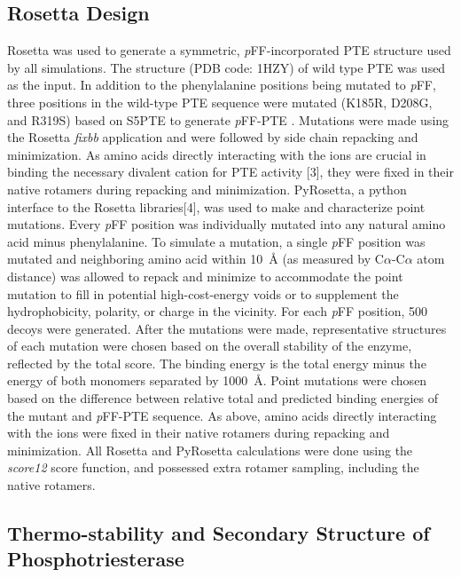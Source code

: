 \begin{refsection}
\subsection{Rosetta Design}
\label{sec:pyrosetta-method}

Rosetta\cite{Leaver-Fay2011,DiMaio2011a} was used to generate a symmetric,
\emph{p}FF-incorporated PTE structure used by all simulations. The structure
(PDB code: 1HZY) of wild type PTE was used as the input. In addition to the
phenylalanine positions being mutated to \emph{p}FF, three positions in the
wild-type PTE sequence were mutated (K185R, D208G, and R319S) based on S5PTE to
generate \emph{p}FF-PTE \cite{Roodveldt2005}. Mutations were made using the
Rosetta \emph{fixbb} application and were followed by side chain repacking and
minimization. As amino acids directly interacting with the  ions
are crucial in binding the necessary divalent cation for PTE activity [3], 
they were fixed in their native rotamers during repacking and minimization.
PyRosetta, a python interface to the Rosetta libraries[4], was used to make and
characterize point mutations. Every \emph{p}FF position was individually
mutated into any natural amino acid minus phenylalanine. To simulate a
mutation, a single \emph{p}FF position was mutated and neighboring amino acid
within \SI{10}{\angstrom} (as measured by C$\alpha$-C$\alpha$ atom distance) was
allowed to repack and minimize to accommodate the point mutation to fill in
potential high-cost-energy voids or to supplement the hydrophobicity, polarity,
or charge in the vicinity. For each \emph{p}FF position, 500 decoys were
generated. After the mutations were made, representative structures of each
mutation were chosen based on the overall stability of the enzyme, reflected by
the total score. The binding energy is the total energy minus the energy of
both monomers separated by \SI{1000}{\angstrom}. Point mutations were chosen
based on the difference between relative total and predicted binding energies
of the mutant and \emph{p}FF-PTE sequence. As above, amino acids directly
interacting with the  ions were fixed in their native rotamers
during repacking and minimization. All Rosetta and PyRosetta calculations were
done using the \emph{score12} score function, and possessed extra rotamer
sampling, including the native rotamers.

\subsection{Thermo-stability and Secondary Structure of Phosphotriesterase}
\label{sec:thermo}


\end{refsection}
